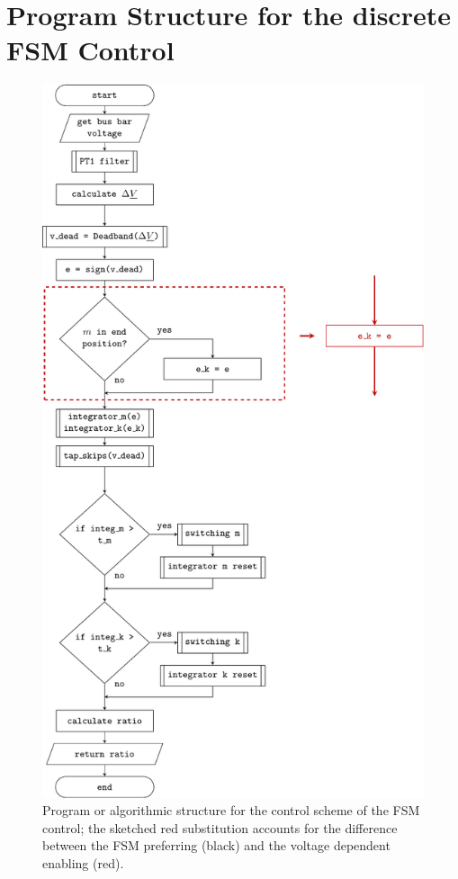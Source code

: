 \section{Program Structure for the discrete FSM Control}

\begin{figure}[H]
    \centering
    \includegraphics[scale=.8]{tikz_graphics/images/fsm_algorithmics.pdf}
    \caption[Program or algorithmic structure for the control scheme of the \acs{FSM} control]{Program or algorithmic structure for the control scheme of the \ac{FSM} control; the sketched red substitution accounts for the difference between the \acs{FSM} preferring (black) and the voltage dependent enabling (red).}
    \label{fig:fsm-program-plan}
\end{figure}

